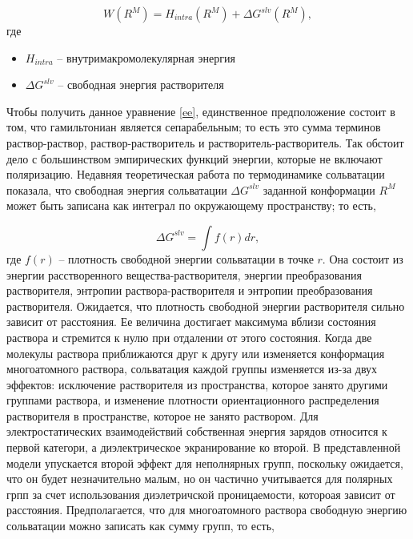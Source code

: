 \begin{equation}
	W(R^M) = H_{intra}(R^M) + \Delta G^{slv}(R^M),
	\label{ee}
\end{equation}
где 

\begin{itemize}
	\item $H_{intra}$ -- внутримакромолекулярная энергия
	\item $\Delta G^{slv}$ -- свободная энергия растворителя
\end{itemize}

Чтобы получить данное уравнение \ref{ee}, единственное предположение состоит в том, что гамильтониан является сепарабельным; то есть это сумма терминов раствор-раствор, раствор-растворитель и растворитель-растворитель. Так обстоит дело с большинством эмпирических функций энергии, которые не включают поляризацию. Недавняя теоретическая работа по термодинамике сольватации показала, что свободная энергия сольватации $\Delta G^{slv}$ заданной конформации $R^M$ может быть записана как интеграл по окружающему пространству; то есть,

\begin{equation}
	\Delta G^{slv} = \int f(r)dr,
	\label{fe}
\end{equation}
где $f(r)$ -- плотность свободной энергии сольватации в точке $r$. Она состоит из энергии расстворенного вещества-растворителя, энергии преобразования растворителя, энтропии раствора-растворителя и энтропии преобразования растворителя. Ожидается, что плотность свободной энергии растворителя сильно зависит от расстояния. Ее величина достигает максимума вблизи состояния раствора и стремится к нулю при отдалении от этого состояния. Когда две молекулы раствора приближаются друг к другу или изменяется конформация многоатомного раствора, сольватация каждой группы изменяется из-за двух эффектов: исключение растворителя из пространства, которое занято другими группами раствора, и изменение плотности ориентационного распределения растворителя в пространстве, которое не занято раствором. Для электростатических взаимодействий собственная энергия зарядов относится к первой категори, а диэлектрическое экранирование ко второй. В представленной модели упускается второй эффект для неполнярных групп, поскольку ожидается, что он будет незначительно малым, но он частично учитывается для полярных грпп за счет использования диэлетричской проницаемости, котороая зависит от расстояния. Предполагается, что для многоатомного раствора свободную энергию сольватации можно записать как сумму групп, то есть,

